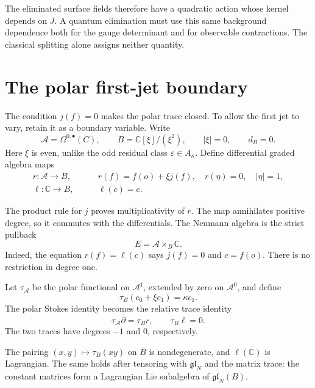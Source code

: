 The eliminated surface fields therefore have a quadratic action whose
kernel depends on $J$. A quantum elimination must use this same
background dependence both for the gauge determinant and for observable
contractions. The classical splitting alone assigns neither quantity.

\section{The polar first-jet boundary}

The condition $j(f)=0$ makes the polar trace closed. To allow the first
jet to vary, retain it as a boundary variable. Write
\[
 \mathcal A=\Omega^{0,\bullet}(C),\qquad
 B=\mathbb C[\xi]/(\xi^2),\qquad |\xi|=0,\qquad d_B=0.
\]
Here $\xi$ is even, unlike the odd residual class
$\varepsilon\in A_\kappa$. Define differential graded algebra maps
\begin{equation}\label{mht:eq:jet-boundary-maps}
 \begin{split}
 r:\mathcal A\longrightarrow B,&\qquad
 r(f)=f(o)+\xi j(f),\quad r(\eta)=0,\quad |\eta|=1,\\
 \ell:\mathbb C\longrightarrow B,&\qquad \ell(c)=c.
 \end{split}
\end{equation}

The product rule for $j$ proves multiplicativity of $r$. The map
annihilates positive degree, so it commutes with the differentials.
The Neumann algebra is the strict pullback
\begin{equation}\label{mht:eq:neumann-pullback}
 E=\mathcal A\times_B\mathbb C.
\end{equation}
Indeed, the equation $r(f)=\ell(c)$ says $j(f)=0$ and $c=f(o)$.
There is no restriction in degree one.

Let $\tau_{\mathcal A}$ be the polar functional on $\mathcal A^1$,
extended by zero on $\mathcal A^0$, and define
\[
 \tau_B(c_0+\xi c_1)=\kappa c_1.
\]
The polar Stokes identity becomes the relative trace identity
\begin{equation}\label{mht:eq:relative-trace}
 \tau_{\mathcal A}\bar\partial=\tau_Br,\qquad
 \tau_B\ell=0.
\end{equation}
The two traces have degrees $-1$ and $0$, respectively.

\begin{proposition}\label{mht:prop:jet-boundary-pairing}
The pairing $(x,y)\mapsto\tau_B(xy)$ on $B$ is nondegenerate, and
$\ell(\mathbb C)$ is Lagrangian. The same holds after tensoring with
$\mathfrak{gl}_N$ and the matrix trace: the constant matrices form a
Lagrangian Lie subalgebra of $\mathfrak{gl}_N(B)$.
\end{proposition}

